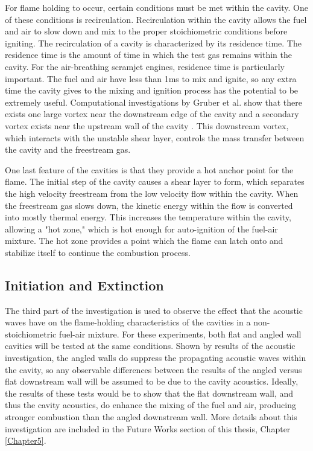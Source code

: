For flame holding to occur, certain conditions must be met within the cavity. One of these conditions is recirculation. Recirculation within the cavity allows the fuel and air to slow down and mix to the proper stoichiometric conditions before igniting. The recirculation of a cavity is characterized by its residence time. The residence time is the amount of time in which the test gas remains within the cavity. For the air-breathing scramjet engines, residence time is particularly important. The fuel and air have less than 1ms to mix and ignite, so any extra time the cavity gives to the mixing and ignition process has the potential to be extremely useful. Computational investigations by Gruber et al. show that there exists one large vortex near the downstream edge of the cavity and a secondary vortex exists near the upstream wall of the cavity \cite{gruber2001fundamental}. This downstream vortex, which interacts with the unstable shear layer, controls the mass transfer between the cavity and the freestream gas. 

One last feature of the cavities is that they provide a hot anchor point for the flame. The initial step of the cavity causes a shear layer to form, which separates the high velocity freestream from the low velocity flow within the cavity. When the freestream gas slows down, the kinetic energy within the flow is converted into mostly thermal energy. This increases the temperature within the cavity, allowing a "hot zone," which is hot enough for auto-ignition of the fuel-air mixture. The hot zone provides a point which the flame can latch onto and stabilize itself to continue the combustion process. 



\subsection{Initiation and Extinction}

The third part of the investigation is used to observe the effect that the acoustic waves have on the flame-holding characteristics of the cavities in a non-stoichiometric fuel-air mixture. For these experiments, both flat and angled wall cavities will be tested at the same conditions. Shown by results of the acoustic investigation, the angled walls do suppress the propagating acoustic waves within the cavity, so any observable differences between the results of the angled versus flat downstream wall will be assumed to be due to the cavity acoustics. Ideally, the results of these tests would be to show that the flat downstream wall, and thus the cavity acoustics, do enhance the mixing of the fuel and air, producing stronger combustion than the angled downstream wall. More details about this investigation are included in the Future Works section of this thesis, Chapter \ref{Chapter5}.


